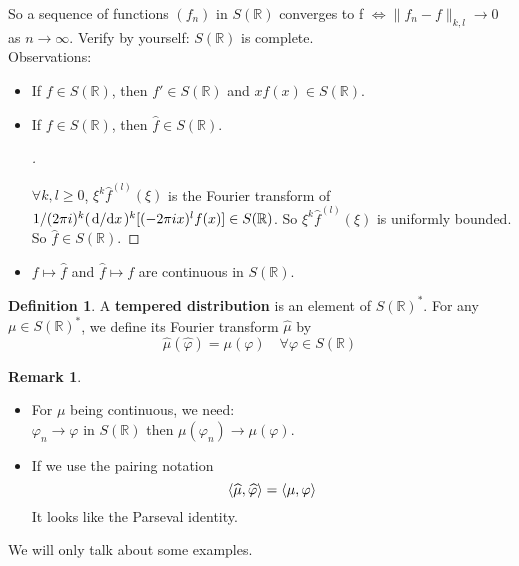\documentclass{article}
\theoremstyle{definition}
\newtheorem{dfn}{Definition}
\newtheorem{rem}{Remark}
\newenvironment{proofs}[1][\proofname]{%
  \begin{proof}[#1]$ $\par\nobreak\ignorespaces
}{%
  \end{proof}
}
\newcommand{\RR}{\mathbb R}
\newcommand{\Lra}{\Leftrightarrow}
\begin{document}
So a sequence of functions $(f_n)$ in $S(\RR)$ converges to f $\Lra \|f_n - f\|_{k, l} \to 0$ as $n \to \infty$.
Verify by yourself: $S(\RR)$ is complete.\\
Observations:
\begin{itemize}
	\item If $f \in S(\RR)$, then $f' \in S(\RR)$ and $x f(x) \in S(\RR)$.

	\item If $f \in S(\RR)$, then $\widehat{f} \in S(\RR)$.
		
		\begin{proofs}
			$\forall k, l \geq 0$, $\xi^k \widehat{f}^{(l)} (\xi)$ is the Fourier transform of $1/(2 \pi i)^k (\dv*{x})^k [(-2 \pi i x)^l f(x)] \in S(\RR)$.
			So $\xi^k \widehat{f}^{(l)} (\xi)$ is uniformly bounded.
			So $\widehat{f} \in S(\RR)$.
		\end{proofs}

	\item $f \mapsto \widehat{f}$ and $\widehat{f} \mapsto f$ are continuous in $S(\RR)$.
\end{itemize}

\begin{dfn}
	A \textbf{tempered distribution} is an element of $S(\RR)^*$.
	For any $\mu \in S(\RR)^*$, we define its Fourier transform $\widehat{\mu}$ by
	\[
		\widehat{\mu}(\widehat{\varphi}) = \mu(\varphi) \quad \forall \varphi \in S(\RR)
	\]
\end{dfn}

\begin{rem}
	$ $\par\nobreak\ignorespaces
	\begin{itemize}
		\item For $\mu$ being continuous, we need:\\
			$\varphi_n \to \varphi$ in $S(\RR)$ then $\mu(\varphi_n) \to \mu(\varphi)$.

		\item If we use the pairing notation 
			\[
				\ev{\widehat{\mu}, \widehat{\varphi}} = \ev{\mu, \varphi}
			\]
			It looks like the Parseval identity.
	\end{itemize}
\end{rem}

We will only talk about some examples.
\end{document}
